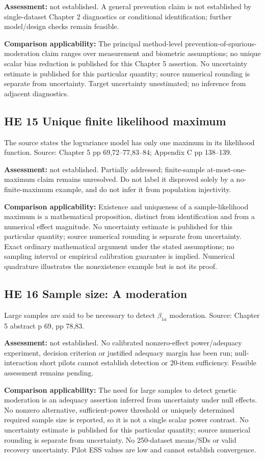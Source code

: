 \documentclass[11pt]{article}
\begin{document}
\textbf{Assessment:} not established. A general prevention claim is not established by single-dataset Chapter 2 diagnostics or conditional identification; further model/design checks remain feasible.

\textbf{Comparison applicability:} The principal method-level prevention-of-spurious-moderation claim ranges over measurement and biometric assumptions; no unique scalar bias reduction is published for this Chapter 5 assertion. No uncertainty estimate is published for this particular quantity; source numerical rounding is separate from uncertainty. Target uncertainty unestimated; no inference from adjacent diagnostics.
\subsection{HE 15 Unique finite likelihood maximum}\label{head:HE15}
The source states the logvariance model has only one maximum in its likelihood function. Source: Chapter 5 pp 69,72--77,83--84; Appendix C pp 138--139.

\textbf{Assessment:} not established. Partially addressed; finite-sample at-most-one-maximum claim remains unresolved. Do not label it disproved solely by a no-finite-maximum example, and do not infer it from population injectivity.

\textbf{Comparison applicability:} Existence and uniqueness of a sample-likelihood maximum is a mathematical proposition, distinct from identification and from a numerical effect magnitude. No uncertainty estimate is published for this particular quantity; source numerical rounding is separate from uncertainty. Exact ordinary mathematical argument under the stated assumptions; no sampling interval or empirical calibration guarantee is implied. Numerical quadrature illustrates the nonexistence example but is not its proof.
\subsection{HE 16 Sample size: A moderation}\label{head:HE16}
Large samples are said to be necessary to detect $\beta_{1a}$ moderation. Source: Chapter 5 abstract p 69, pp 78,83.

\textbf{Assessment:} not established. No calibrated nonzero-effect power/adequacy experiment, decision criterion or justified adequacy margin has been run; null-interaction short pilots cannot establish detection or 20-item sufficiency. Feasible assessment remains pending.

\textbf{Comparison applicability:} The need for large samples to detect genetic moderation is an adequacy assertion inferred from uncertainty under null effects. No nonzero alternative, sufficient-power threshold or uniquely determined required sample size is reported, so it is not a single scalar power contrast. No uncertainty estimate is published for this particular quantity; source numerical rounding is separate from uncertainty. No 250-dataset means/SDs or valid recovery uncertainty. Pilot ESS values are low and cannot establish convergence.
\end{document}
